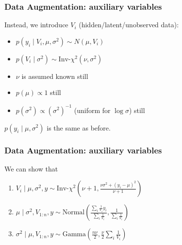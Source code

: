 \documentclass{beamer}
\begin{document}
\begin{frame}
\frametitle{Data Augmentation: auxiliary variables}

Instead, we introduce $V_i$ (hidden/latent/unobserved data):
\begin{itemize}
\item $p(y_i \mid V_i, \mu, \sigma^2) \sim N(\mu, V_i)$
\item $p(V_i \mid \sigma^2) \sim \mbox{Inv-}\chi^2(\nu,\sigma^2)$   
\item $\nu$ is assumed known still
\item $p(\mu) \propto 1$ still
\item $p(\sigma^2) \propto (\sigma^2)^{-1}$ (uniform for $\log \sigma$) still
\end{itemize}


\vspace{0.2cm}
$p(y_i \mid \mu, \sigma^2)$ is the same as before.
\end{frame}



\begin{frame}
\frametitle{Data Augmentation: auxiliary variables}

We can show that
\begin{enumerate}
\item $V_i \mid \mu, \sigma^2, y \sim \text{Inv-}\chi^2\left(\nu + 1, \frac{ \nu \sigma^2 + (y_i - \mu)^2 }{\nu+1 } \right)$
\item $\mu \mid \sigma^2, V_{1:n}, y \sim \text{Normal}\left(\frac{\sum_i \frac{1}{V_i}y_i }{\sum_i \frac{1}{V_i} }, \frac{1}{ \sum_i \frac{1}{V_i} }\right)$ 
\item $\sigma^2 \mid \mu, V_{1:n}, y \sim \text{Gamma}\left(\frac{n \nu}{2}, \frac{\nu}{2}\sum_i \frac{1}{V_i} \right)$
\end{enumerate}

\end{frame}
\end{document}
